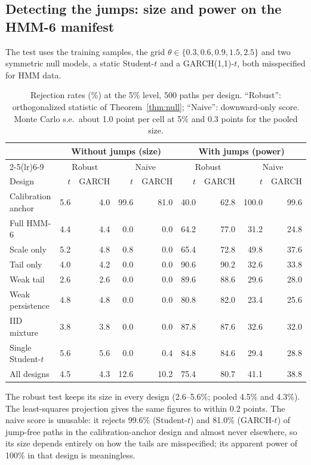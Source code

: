 \documentclass[11pt,a4paper]{article}
\theoremstyle{definition}
\theoremstyle{remark}
\begin{document}
\subsection{Detecting the jumps: size and power on the HMM-6 manifest}\label{sec:full}
The test uses the training samples, the grid $\theta\in\{0.3,0.6,0.9,1.5,2.5\}$ and two symmetric null models, a static Student-$t$ and a GARCH(1,1)-$t$, both misspecified for HMM data.

\begin{table}[ht]\centering\footnotesize\setlength{\tabcolsep}{4pt}
\caption{Rejection rates (\%) at the 5\% level, 500 paths per design. ``Robust'': orthogonalized statistic of Theorem~\ref{thm:null}; ``Naive'': downward-only score. Monte Carlo s.e.\ about 1.0 point per cell at 5\% and 0.3 points for the pooled size.}\label{tab:full}
\begin{tabular}{l rr rr rr rr}
\toprule
 & \multicolumn{4}{c}{Without jumps (size)} & \multicolumn{4}{c}{With jumps (power)}\\
\cmidrule(lr){2-5}\cmidrule(lr){6-9}
 & \multicolumn{2}{c}{Robust} & \multicolumn{2}{c}{Naive} & \multicolumn{2}{c}{Robust} & \multicolumn{2}{c}{Naive}\\
Design & $t$ & GARCH & $t$ & GARCH & $t$ & GARCH & $t$ & GARCH\\
\midrule
Calibration anchor & 5.6 & 4.0 & 99.6 & 81.0 & 40.0 & 62.8 & 100.0 & 99.6\\
Full HMM-6 & 4.4 & 4.4 & 0.0 & 0.0 & 64.2 & 77.0 & 31.2 & 24.8\\
Scale only & 5.2 & 4.8 & 0.8 & 0.0 & 65.4 & 72.8 & 49.8 & 37.6\\
Tail only & 4.0 & 4.2 & 0.0 & 0.0 & 90.6 & 90.2 & 32.6 & 33.8\\
Weak tail & 2.6 & 2.6 & 0.0 & 0.0 & 89.6 & 88.6 & 29.6 & 28.0\\
Weak persistence & 4.8 & 4.8 & 0.0 & 0.0 & 80.8 & 82.0 & 23.4 & 25.6\\
IID mixture & 3.8 & 3.8 & 0.0 & 0.0 & 87.8 & 87.6 & 32.6 & 32.0\\
Single Student-$t$ & 5.6 & 5.6 & 0.0 & 0.4 & 84.8 & 84.6 & 29.4 & 28.8\\
\midrule
All designs & 4.5 & 4.3 & 12.6 & 10.2 & 75.4 & 80.7 & 41.1 & 38.8\\
\bottomrule
\end{tabular}
\end{table}

The robust test keeps its size in every design (2.6--5.6\%; pooled 4.5\% and 4.3\%). The least-squares projection gives the same figures to within 0.2 points. The naive score is unusable: it rejects 99.6\% (Student-$t$) and 81.0\% (GARCH-$t$) of jump-free paths in the calibration-anchor design and almost never elsewhere, so its size depends entirely on how the tails are misspecified; its apparent power of 100\% in that design is meaningless.
\end{document}
